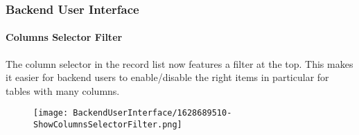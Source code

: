 %

\begin{frame}[fragile]
	\frametitle{Backend User Interface}
	\framesubtitle{Columns Selector Filter}

	The column selector in the record list now features a filter at the top.
	This makes it easier for backend users to enable/disable the right items
	in particular for tables with many columns.

	\begin{figure}
		\texttt{[image: BackendUserInterface/1628689510-ShowColumnsSelectorFilter.png]}
	\end{figure}

\end{frame}

